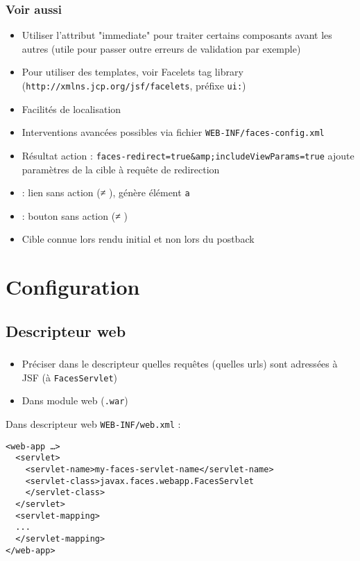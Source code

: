 \documentclass[english, french]{beamer}
\begin{document}
\begin{frame}
	\frametitle{Voir aussi}
	\begin{itemize}
		\item Utiliser l’attribut "immediate" pour traiter certains composants avant les autres (utile pour passer outre erreurs de validation par exemple)
		\item Pour utiliser des templates, voir Facelets tag library (\texttt{http://xmlns.jcp.org/jsf/facelets}, préfixe \texttt{ui:}) %
		\item Facilités de localisation
		\item Interventions avancées possibles via fichier \texttt{WEB-INF/faces-config.xml}
		\item Résultat action : {\texttt{faces-redirect=true\&amp;includeViewParams=true}} ajoute paramètres de la cible à requête de redirection
		\item {} : lien sans action ({≠} ), génère élément \texttt{a}
		\item {} : bouton sans action ({≠} )
		\item Cible connue lors rendu initial {\tiny et non lors du postback}
	\end{itemize}
\end{frame}

\section{Configuration}
\subsection{Descripteur web}
\begin{frame}[fragile]
	\frametitle{\subsecname}
	\begin{itemize}
		\item Préciser dans le descripteur quelles requêtes (quelles urls) sont adressées à JSF (à \texttt{FacesServlet})
		\item Dans module web (\texttt{.war})
	\end{itemize}
	Dans descripteur web \texttt{WEB-INF/web.xml} :
	\begin{lstlisting}[aboveskip=0.2em, belowskip=0em]
<web-app …>
  <servlet>
    <servlet-name>my-faces-servlet-name</servlet-name>
    <servlet-class>javax.faces.webapp.FacesServlet
    </servlet-class>
  </servlet>
  <servlet-mapping>
  ...
  </servlet-mapping>
</web-app>
	\end{lstlisting}
\end{frame}
\end{document}
